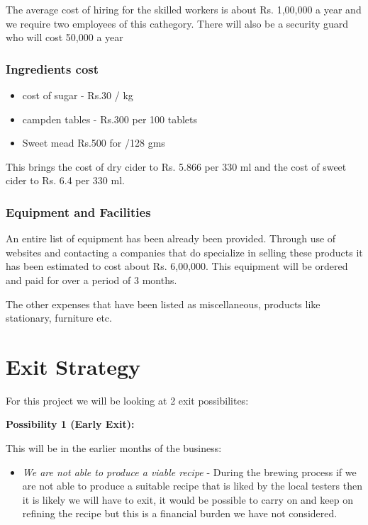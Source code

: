 \documentclass[11pt]{article}
\begin{document}
The average cost of hiring for the skilled workers is about Rs. 1,00,000 a year
and we require two employees of this cathegory. There will also be a security
guard who will cost 50,000 a year

   \subsubsection{Ingredients cost}
\begin{itemize}
\item cost of sugar -  Rs.30 / kg
\item campden tables  - Rs.300 per 100 tablets
\item Sweet mead Rs.500 for /128 gms
\end{itemize}

This brings the cost of dry cider to Rs. 5.866 per 330 ml and the cost of sweet
cider to Rs. 6.4 per 330 ml.

     \subsubsection{Equipment and Facilities}
An entire list of equipment has been already been provided. Through use of
websites and contacting a companies that do specialize in selling these products
it has been estimated to cost about Rs. 6,00,000. This equipment will be
ordered and paid for over a period of 3 months.

The other expenses that have been listed as miscellaneous, products like
stationary, furniture etc.

\newpage


\section{Exit Strategy}
For this project we will be looking at 2 exit possibilites:

\textbf{Possibility 1 (Early Exit):}

This will be in the earlier months of the business:
  \begin{itemize}
	\item \emph{We are not able to produce a viable recipe} - During the brewing
process if we are not able to produce a suitable recipe that is liked by the
local testers then it is likely we will have to exit, it would be possible to
carry on and keep on refining the recipe but this is a financial burden we have
not considered.
  \end{itemize}
\end{document}
